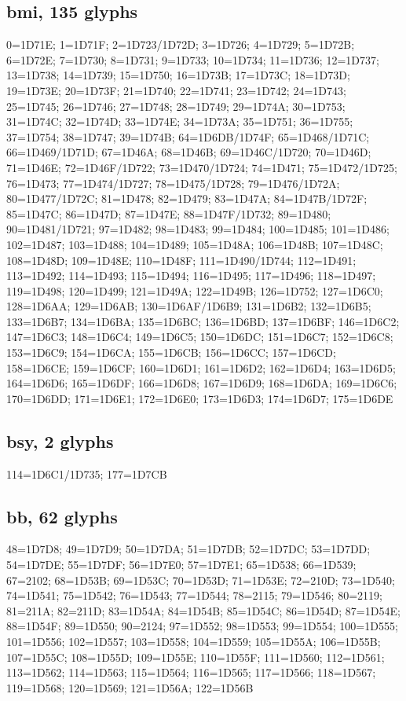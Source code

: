 \subsection*{bmi, 135 glyphs}
\raggedright\small 0=1D71E; 1=1D71F; 2=1D723/1D72D; 3=1D726; 4=1D729; 5=1D72B;
6=1D72E; 7=1D730; 8=1D731; 9=1D733; 10=1D734; 11=1D736; 12=1D737; 13=1D738;
14=1D739; 15=1D750; 16=1D73B; 17=1D73C; 18=1D73D; 19=1D73E; 20=1D73F; 21=1D740;
22=1D741; 23=1D742; 24=1D743; 25=1D745; 26=1D746; 27=1D748; 28=1D749; 29=1D74A;
30=1D753; 31=1D74C; 32=1D74D; 33=1D74E; 34=1D73A; 35=1D751; 36=1D755; 37=1D754;
38=1D747; 39=1D74B; 64=1D6DB/1D74F; 65=1D468/1D71C; 66=1D469/1D71D; 67=1D46A;
68=1D46B; 69=1D46C/1D720; 70=1D46D; 71=1D46E; 72=1D46F/1D722; 73=1D470/1D724;
74=1D471; 75=1D472/1D725; 76=1D473; 77=1D474/1D727; 78=1D475/1D728;
79=1D476/1D72A; 80=1D477/1D72C; 81=1D478; 82=1D479; 83=1D47A; 84=1D47B/1D72F;
85=1D47C; 86=1D47D; 87=1D47E; 88=1D47F/1D732; 89=1D480; 90=1D481/1D721;
97=1D482; 98=1D483; 99=1D484; 100=1D485; 101=1D486; 102=1D487; 103=1D488;
104=1D489; 105=1D48A; 106=1D48B; 107=1D48C; 108=1D48D; 109=1D48E; 110=1D48F;
111=1D490/1D744; 112=1D491; 113=1D492; 114=1D493; 115=1D494; 116=1D495;
117=1D496; 118=1D497; 119=1D498; 120=1D499; 121=1D49A; 122=1D49B; 126=1D752;
127=1D6C0; 128=1D6AA; 129=1D6AB; 130=1D6AF/1D6B9; 131=1D6B2; 132=1D6B5;
133=1D6B7; 134=1D6BA; 135=1D6BC; 136=1D6BD; 137=1D6BF; 146=1D6C2; 147=1D6C3;
148=1D6C4; 149=1D6C5; 150=1D6DC; 151=1D6C7; 152=1D6C8; 153=1D6C9; 154=1D6CA;
155=1D6CB; 156=1D6CC; 157=1D6CD; 158=1D6CE; 159=1D6CF; 160=1D6D1; 161=1D6D2;
162=1D6D4; 163=1D6D5; 164=1D6D6; 165=1D6DF; 166=1D6D8; 167=1D6D9; 168=1D6DA;
169=1D6C6; 170=1D6DD; 171=1D6E1; 172=1D6E0; 173=1D6D3; 174=1D6D7; 175=1D6DE\par

\subsection*{bsy, 2 glyphs}
\raggedright\small 114=1D6C1/1D735; 177=1D7CB\par

\subsection*{bb, 62 glyphs}
\raggedright\small 48=1D7D8; 49=1D7D9; 50=1D7DA; 51=1D7DB; 52=1D7DC; 53=1D7DD;
54=1D7DE; 55=1D7DF; 56=1D7E0; 57=1D7E1; 65=1D538; 66=1D539; 67=2102; 68=1D53B;
69=1D53C; 70=1D53D; 71=1D53E; 72=210D; 73=1D540; 74=1D541; 75=1D542; 76=1D543;
77=1D544; 78=2115; 79=1D546; 80=2119; 81=211A; 82=211D; 83=1D54A; 84=1D54B;
85=1D54C; 86=1D54D; 87=1D54E; 88=1D54F; 89=1D550; 90=2124; 97=1D552; 98=1D553;
99=1D554; 100=1D555; 101=1D556; 102=1D557; 103=1D558; 104=1D559; 105=1D55A;
106=1D55B; 107=1D55C; 108=1D55D; 109=1D55E; 110=1D55F; 111=1D560; 112=1D561;
113=1D562; 114=1D563; 115=1D564; 116=1D565; 117=1D566; 118=1D567; 119=1D568;
120=1D569; 121=1D56A; 122=1D56B\par

